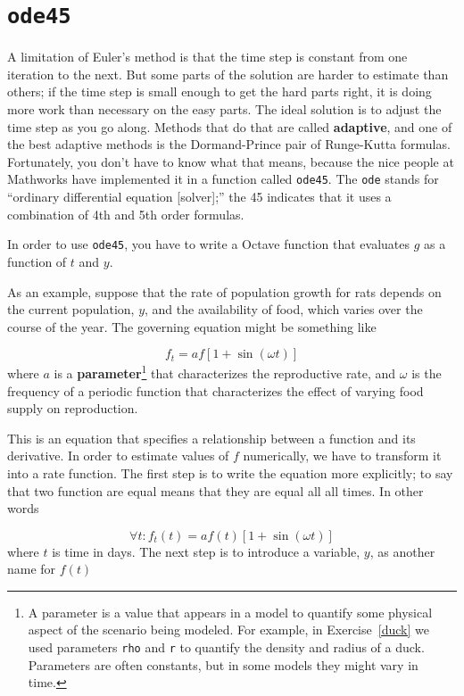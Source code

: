 \documentclass{book}
\begin{document}
\section{{\tt ode45}}
\label{ode45}

A limitation of Euler's method is that the time step is constant from
one iteration to the next. But some parts of the solution are
harder to estimate than others; if the time step is small enough to
get the hard parts right, it is doing more work than necessary on the
easy parts. The ideal solution is to adjust the time step as you go
along. Methods that do that are called {\bf adaptive}, and one of the
best adaptive methods is the Dormand-Prince pair of Runge-Kutta
formulas. Fortunately, you don't have to know what that means,
because the nice people at Mathworks have implemented it in a function
called {\tt ode45}. The {\tt ode} stands for ``ordinary differential
equation [solver];'' the 45 indicates that it uses a combination of
4th and 5th order formulas.

In order to use {\tt ode45}, you have to write a Octave function
that evaluates $g$ as a function of
$t$ and $y$.


As an example, suppose that the rate of population growth for rats
depends on the current population, $y$, and the availability of food,
which varies over the course of the year.
The governing equation might be something like

\[ f_t = a f \left[1 + \sin (\omega t) \right] \]
%
where $a$ is
a {\bf parameter}\footnote{A parameter is a value that appears
in a model to quantify some physical aspect of the scenario being
modeled. For example, in Exercise~\ref{duck} we used parameters
{\tt rho} and {\tt r} to quantify the density and radius of a
duck. Parameters are often constants, but in some models they
might vary in time.} 
that characterizes the reproductive rate, and
$\omega$ is the frequency of a periodic function that characterizes
the effect of varying food supply on reproduction.

This is an equation that specifies a relationship between a
function and its derivative. In order to estimate values of
$f$ numerically, we have to transform it into a rate function.
The first step is to write the equation more explicitly; to
say that two function are equal means that they are equal
all all times. In other words

\[ \forall t: f_t(t) = a f(t) \left[1 + \sin (\omega t) \right] \]
%
where $t$ is time in days. The next step is to introduce a variable,
$y$, as another name for $f(t)$
\end{document}

